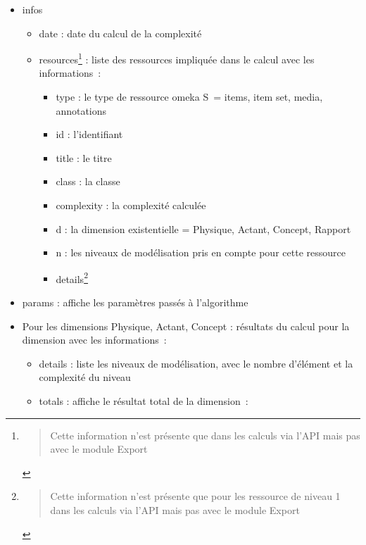 \documentclass[
  letterpaper,
  DIV=11,
  numbers=noendperiod]{scrreprt}
\providecommand{\tightlist}{%
  \setlength{\itemsep}{0pt}\setlength{\parskip}{0pt}}\usepackage{longtable,booktabs,array}
\begin{document}
\begin{itemize}
\item
  infos

  \begin{itemize}
  \item
    date : date du calcul de la complexité
  \item
    resources\footnote{\begin{quote}
      Cette information n'est présente que dans les calculs via l'API
      mais pas avec le module Export
      \end{quote}} : liste des ressources impliquée dans le calcul avec
    les informations~:

    \begin{itemize}
    \tightlist
    \item
      type : le type de ressource omeka S~= items, item set, media,
      annotations
    \item
      id : l'identifiant
    \item
      title : le titre
    \item
      class : la classe
    \item
      complexity : la complexité calculée
    \item
      d : la dimension existentielle = Physique, Actant, Concept,
      Rapport
    \item
      n : les niveaux de modélisation pris en compte pour cette
      ressource
    \item
      details\footnote{\begin{quote}
        Cette information n'est présente que pour les ressource de
        niveau 1 dans les calculs via l'API mais pas avec le module
        Export
        \end{quote}}
    \end{itemize}
  \end{itemize}
\item
  params : affiche les paramètres passés à l'algorithme
\item
  Pour les dimensions Physique, Actant, Concept : résultats du calcul
  pour la dimension avec les informations~:

  \begin{itemize}
  \item
    details : liste les niveaux de modélisation, avec le nombre
    d'élément et la complexité du niveau
  \item
    totals : affiche le résultat total de la dimension~:


\end{itemize}
\end{itemize}
\end{document}
